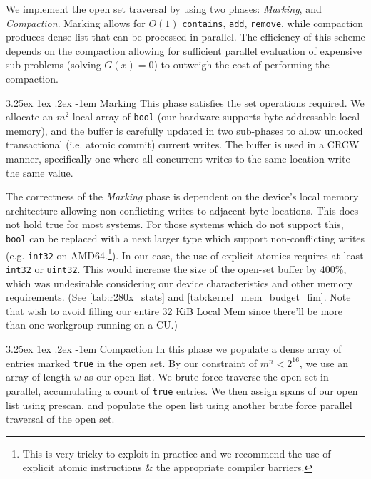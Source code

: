 \documentclass[11pt]{article}       %
\makeatletter
\newcounter{subsubsubsection}[subsubsection]
\renewcommand\paragraph{\@startsection{paragraph}{5}{\z@}%
	{3.25ex \@plus1ex \@minus.2ex}%
	{-1em}%
	{\normalfont\normalsize\bfseries}}
\makeatother
\begin{document}
We implement the open set traversal by using two phases: \textit{Marking}, and \textit{Compaction}. Marking allows for $O(1)$ \texttt{contains}, \texttt{add}, \texttt{remove}, while compaction produces dense list that can be processed in parallel. The efficiency of this scheme depends on the compaction allowing for sufficient parallel evaluation of expensive sub-problems (solving $G(x) = 0$) to outweigh the cost of performing the compaction.

\paragraph{Marking}
This phase satisfies the set operations required. We allocate an $m^2$ local array of \texttt{bool} (our hardware supports byte-addressable local memory), and the buffer is carefully updated in two sub-phases to allow unlocked transactional (i.e. atomic commit) current writes. The buffer is used in a CRCW manner, specifically one where all concurrent writes to the same location write the same value.

The correctness of the \textit{Marking} phase is dependent on the device's local memory architecture allowing non-conflicting writes to adjacent byte locations. This does not hold true for most systems. For those systems which do not support this, \texttt{bool} can be replaced with a next larger type which support non-conflicting writes (e.g. \texttt{int32} on AMD64.\footnote{This is very tricky to exploit in practice and we recommend the use of explicit atomic instructions \& the appropriate compiler barriers.}). In our case, the use of explicit atomics requires at least \texttt{int32} or \texttt{uint32}. This would increase the size of the open-set buffer by 400\%, which was undesirable considering our device characteristics and other memory requirements. (See \autoref{tab:r280x_stats} and \autoref{tab:kernel_mem_budget_fim}. Note that wish to avoid filling our entire 32 KiB Local Mem since there'll be more than one workgroup running on a CU.)



\paragraph{Compaction}
In this phase we populate a dense array of entries marked \texttt{true} in the open set. By our constraint of $m^n < 2^{16}$, we use an  array of length $w$ as our open list. We brute force traverse the open set in parallel, accumulating a count of \texttt{true} entries. We then assign spans of our open list using prescan, and populate the open list using another brute force parallel traversal of the open set.
\end{document}
